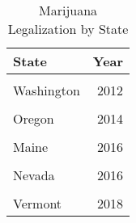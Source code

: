 \begin{table}[H]

\caption{\label{tab:tab:rollout}Marijuana Legalization by State}
\centering
\begin{tabular}[t]{lr}
\toprule
State & Year\\
\midrule
\cellcolor{gray!6}{Colorado} & \cellcolor{gray!6}{2012}\\
Washington & 2012\\
\cellcolor{gray!6}{Alaska} & \cellcolor{gray!6}{2014}\\
Oregon & 2014\\
\cellcolor{gray!6}{California} & \cellcolor{gray!6}{2016}\\
\addlinespace
Maine & 2016\\
\cellcolor{gray!6}{Massachusetts} & \cellcolor{gray!6}{2016}\\
Nevada & 2016\\
\cellcolor{gray!6}{Michigan} & \cellcolor{gray!6}{2018}\\
Vermont & 2018\\
\bottomrule
\end{tabular}
\end{table}
